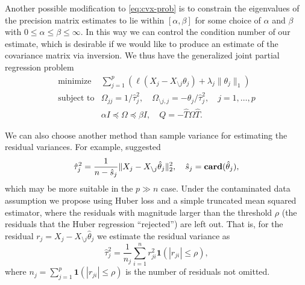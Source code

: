 \documentclass{article}
\begin{document}
Another possible modification to \eqref{eq:cvx-prob} is to constrain the
eigenvalues of the precision matrix estimates to lie within $[\alpha, \beta]$
for some choice of $\alpha$ and $\beta$ with $0 \leq \alpha \leq \beta \leq
\infty$. In this way we can control the condition number of our estimate, which
is desirable if we would like to produce an estimate of the covariance matrix
via inversion. We thus have the generalized joint partial regression problem
\begin{equation}\label{eq:cvx-prob-general}
    \begin{array}{ll}
        \text{minimize} & \displaystyle \sum_{j=1}^{p} \left( \ell(X_j - X_{\setminus j} \theta_j) + \lambda_j \|\theta_j\|_1 \right) \\
        \text{subject to} & \Omega_{jj} = 1 / \hat\tau_j^2, \quad \Omega_{\setminus j, j} = -\theta_j / \hat\tau_j^2, \quad j = 1, \dots, p \\
        & \alpha I \preceq \Omega \preceq \beta I, \quad Q = -\widehat{T} \Omega \widehat{T}.
    \end{array}
\end{equation}

We can also choose another method than sample variance for estimating the residual variances.
For example, \cite{Fan12} suggested
\[
    \hat\tau_j^2 = \frac{1}{n - \hat s_j} \|X_j - X_{\setminus j}\hat \theta_j\|_2^2, \quad \hat s_j = \mathop{\bf card}(\hat\theta_j),
\]
which may be more suitable in the $p \gg n$ case. Under the contaminated data
assumption we propose using Huber loss and a simple truncated mean squared
estimator, where the residuals with magnitude larger than the threshold $\rho$
(the residuals that the Huber regression ``rejected'') are left out. That is,
for the residual $r_j = X_j - X_{\setminus j} \hat \theta_j$ we estimate the
residual variance  as 
\begin{equation}\label{eq:robust-variance-estimator}
    \hat\tau_j^2 = \frac{1}{n_j} \sum_{i=1}^{n} r_{ji}^2 \mathbf{1}(|r_{ji}| \leq \rho),
\end{equation}
where $n_j = \sum_{j=1}^{p} \mathbf{1}(|r_{ji}| \leq \rho)$ is the number of
residuals not omitted.



    
\end{document}
